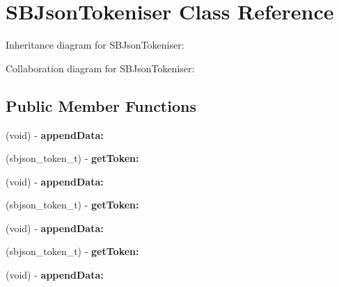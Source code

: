 \hypertarget{interface_s_b_json_tokeniser}{
\section{\-S\-B\-Json\-Tokeniser \-Class \-Reference}
\label{interface_s_b_json_tokeniser}
}


\-Inheritance diagram for \-S\-B\-Json\-Tokeniser\-:


\-Collaboration diagram for \-S\-B\-Json\-Tokeniser\-:
\subsection*{\-Public \-Member \-Functions}
\begin{DoxyCompactItemize}
\item 
\hypertarget{interface_s_b_json_tokeniser_a8780ad4eed5b72b979dfbaf19bfbd39f}{
(void) -\/ {\bfseries append\-Data\-:}}
\label{interface_s_b_json_tokeniser_a8780ad4eed5b72b979dfbaf19bfbd39f}

\item 
\hypertarget{interface_s_b_json_tokeniser_a9244d283305dcafc6ec9c4ccfed91e1a}{
(sbjson\-\_\-token\-\_\-t) -\/ {\bfseries get\-Token\-:}}
\label{interface_s_b_json_tokeniser_a9244d283305dcafc6ec9c4ccfed91e1a}

\item 
\hypertarget{interface_s_b_json_tokeniser_a8780ad4eed5b72b979dfbaf19bfbd39f}{
(void) -\/ {\bfseries append\-Data\-:}}
\label{interface_s_b_json_tokeniser_a8780ad4eed5b72b979dfbaf19bfbd39f}

\item 
\hypertarget{interface_s_b_json_tokeniser_a9244d283305dcafc6ec9c4ccfed91e1a}{
(sbjson\-\_\-token\-\_\-t) -\/ {\bfseries get\-Token\-:}}
\label{interface_s_b_json_tokeniser_a9244d283305dcafc6ec9c4ccfed91e1a}

\item 
\hypertarget{interface_s_b_json_tokeniser_a8780ad4eed5b72b979dfbaf19bfbd39f}{
(void) -\/ {\bfseries append\-Data\-:}}
\label{interface_s_b_json_tokeniser_a8780ad4eed5b72b979dfbaf19bfbd39f}

\item 
\hypertarget{interface_s_b_json_tokeniser_a9244d283305dcafc6ec9c4ccfed91e1a}{
(sbjson\-\_\-token\-\_\-t) -\/ {\bfseries get\-Token\-:}}
\label{interface_s_b_json_tokeniser_a9244d283305dcafc6ec9c4ccfed91e1a}

\item 
\hypertarget{interface_s_b_json_tokeniser_a8780ad4eed5b72b979dfbaf19bfbd39f}{
(void) -\/ {\bfseries append\-Data\-:}}
\label{interface_s_b_json_tokeniser_a8780ad4eed5b72b979dfbaf19bfbd39f}


\end{DoxyCompactItemize}
